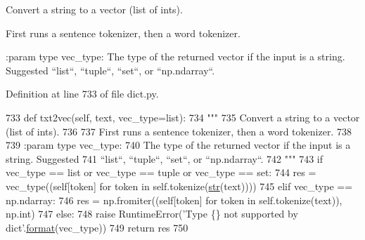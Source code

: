 \begin{DoxyVerb}Convert a string to a vector (list of ints).

First runs a sentence tokenizer, then a word tokenizer.

:param type vec_type:
    The type of the returned vector if the input is a string. Suggested
    ``list``, ``tuple``, ``set``, or ``np.ndarray``.
\end{DoxyVerb}
 

Definition at line 733 of file dict.\+py.


\begin{DoxyCode}
733     \textcolor{keyword}{def }txt2vec(self, text, vec\_type=list):
734         \textcolor{stringliteral}{"""}
735 \textcolor{stringliteral}{        Convert a string to a vector (list of ints).}
736 \textcolor{stringliteral}{}
737 \textcolor{stringliteral}{        First runs a sentence tokenizer, then a word tokenizer.}
738 \textcolor{stringliteral}{}
739 \textcolor{stringliteral}{        :param type vec\_type:}
740 \textcolor{stringliteral}{            The type of the returned vector if the input is a string. Suggested}
741 \textcolor{stringliteral}{            ``list``, ``tuple``, ``set``, or ``np.ndarray``.}
742 \textcolor{stringliteral}{        """}
743         \textcolor{keywordflow}{if} vec\_type == list \textcolor{keywordflow}{or} vec\_type == tuple \textcolor{keywordflow}{or} vec\_type == set:
744             res = vec\_type((self[token] \textcolor{keywordflow}{for} token \textcolor{keywordflow}{in} self.tokenize(\hyperlink{namespacegenerate__task__READMEs_a5b88452ffb87b78c8c85ececebafc09f}{str}(text))))
745         \textcolor{keywordflow}{elif} vec\_type == np.ndarray:
746             res = np.fromiter((self[token] \textcolor{keywordflow}{for} token \textcolor{keywordflow}{in} self.tokenize(text)), np.int)
747         \textcolor{keywordflow}{else}:
748             \textcolor{keywordflow}{raise} RuntimeError(\textcolor{stringliteral}{'Type \{\} not supported by dict'}.\hyperlink{namespaceparlai_1_1chat__service_1_1services_1_1messenger_1_1shared__utils_a32e2e2022b824fbaf80c747160b52a76}{format}(vec\_type))
749         \textcolor{keywordflow}{return} res
750 
\end{DoxyCode}
\mbox{\label{classparlai_1_1core_1_1dict_1_1DictionaryAgent_af2eeb50b2cd6cf3a8ca817b729ec7486}} 
